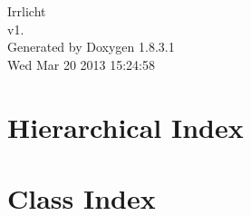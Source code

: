 \documentclass{book}
\begin{document}
\hypersetup{pageanchor=false,citecolor=blue}
\begin{titlepage}
\vspace*{7cm}
\begin{center}
{\Large Irrlicht \\[1ex]\large v1. }\\
\vspace*{1cm}
{\large Generated by Doxygen 1.8.3.1}\\
\vspace*{0.5cm}
{\small Wed Mar 20 2013 15:24:58}\\
\end{center}
\end{titlepage}
\clearemptydoublepage
{}
\tableofcontents
\clearemptydoublepage
{}
\hypersetup{pageanchor=true,citecolor=blue}
\chapter{Hierarchical Index}

\chapter{Class Index}

\end{document}
